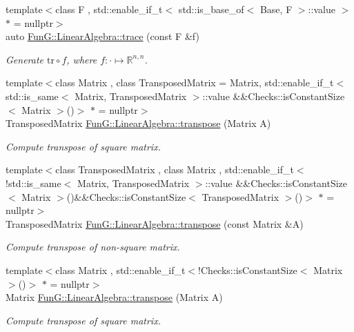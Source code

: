\begin{DoxyCompactItemize}
{\footnotesize template$<$class F , std\+::enable\+\_\+if\+\_\+t$<$ std\+::is\+\_\+base\+\_\+of$<$ Base, F $>$\+::value $>$ $\ast$  = nullptr$>$ }\\auto \hyperlink{group__LinearAlgebraGroup_ga950717870525c43be79245413717673c}{Fun\+G\+::\+Linear\+Algebra\+::trace} (const F \&f)
\begin{DoxyCompactList}\small\item\em Generate $\mathrm{tr}\circ f$, where $f:\cdot\mapsto\mathbb{R}^{n,n} $. \end{DoxyCompactList}\item 
{\footnotesize template$<$class Matrix , class Transposed\+Matrix  = Matrix, std\+::enable\+\_\+if\+\_\+t$<$ std\+::is\+\_\+same$<$ Matrix, Transposed\+Matrix $>$\+::value \&\&\+Checks\+::is\+Constant\+Size$<$ Matrix $>$()$>$ $\ast$  = nullptr$>$ }\\Transposed\+Matrix \hyperlink{group__LinearAlgebraGroup_gaf299ac9490ae23da0a3a3d784e379d1f}{Fun\+G\+::\+Linear\+Algebra\+::transpose} (Matrix A)
\begin{DoxyCompactList}\small\item\em Compute transpose of square matrix. \end{DoxyCompactList}\item 
{\footnotesize template$<$class Transposed\+Matrix , class Matrix , std\+::enable\+\_\+if\+\_\+t$<$!std\+::is\+\_\+same$<$ Matrix, Transposed\+Matrix $>$\+::value \&\&\+Checks\+::is\+Constant\+Size$<$ Matrix $>$()\&\&\+Checks\+::is\+Constant\+Size$<$ Transposed\+Matrix $>$()$>$ $\ast$  = nullptr$>$ }\\Transposed\+Matrix \hyperlink{group__LinearAlgebraGroup_gaffe414459cb85a455a3c5a2099cfc6ee}{Fun\+G\+::\+Linear\+Algebra\+::transpose} (const Matrix \&A)
\begin{DoxyCompactList}\small\item\em Compute transpose of non-\/square matrix. \end{DoxyCompactList}\item 
{\footnotesize template$<$class Matrix , std\+::enable\+\_\+if\+\_\+t$<$!\+Checks\+::is\+Constant\+Size$<$ Matrix $>$()$>$ $\ast$  = nullptr$>$ }\\Matrix \hyperlink{group__LinearAlgebraGroup_gac3427d39b75727a255e5ea387c50ff10}{Fun\+G\+::\+Linear\+Algebra\+::transpose} (Matrix A)
\begin{DoxyCompactList}\small\item\em Compute transpose of square matrix. \end{DoxyCompactList}\item 

\end{DoxyCompactItemize}
